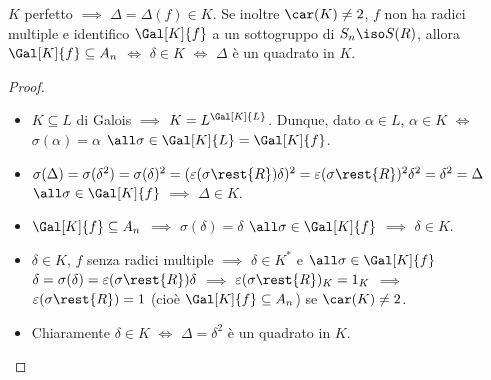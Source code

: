 \begin{prop}
\(K\) perfetto \(\implies\) \(\Delta=\Delta(f)\in K\). Se inoltre \(\car(K)\ne2\), \(f\) non ha radici multiple e identifico \(\Gal[K]{f}\) a un sottogruppo di \(S_n\iso S(R)\), allora \(\Gal[K]{f}\subseteq A_n\) \(\iff\) \(\delta\in K\) \(\iff\) \(\Delta\) è un quadrato in \(K\).
\end{prop}
\begin{proof}
\begin{itemize}
\item \(K\subseteq L\) di Galois \(\implies\) \(K=L^{\Gal[K]{L}}\). Dunque, dato \(\alpha\in L\), \(\alpha\in K\) \(\iff\) \(\sigma(\alpha)=\alpha\) \(\all\sigma\in\Gal[K]{L}=\Gal[K]{f}\).
\item \(\sigma(\Delta)=\sigma(\delta^2)=\sigma(\delta)^2=(\varepsilon(\sigma\rest{R})\delta)^2=\varepsilon(\sigma\rest{R})^2\delta^2=\delta^2=\Delta\) \(\all\sigma\in\Gal[K]{f}\) \(\implies\) \(\Delta\in K\).
\item \(\Gal[K]{f}\subseteq A_n\) \(\implies\) \(\sigma(\delta)=\delta\) \(\all\sigma\in\Gal[K]{f}\) \(\implies\) \(\delta\in K\).
\item \(\delta\in K\), \(f\) senza radici multiple \(\implies\) \(\delta\in K^*\) e \(\all\sigma\in\Gal[K]{f}\) \(\delta=\sigma(\delta)=\varepsilon(\sigma\rest{R})\delta\) \(\implies\) \(\varepsilon(\sigma\rest{R})_K=1_K\) \(\implies\) \(\varepsilon(\sigma\rest{R})=1\) (cioè \(\Gal[K]{f}\subseteq A_n\)) se \(\car(K)\ne2\).
\item Chiaramente \(\delta\in K\) \(\iff\) \(\Delta=\delta^2\) è un quadrato in \(K\).
\end{itemize}
\end{proof}



